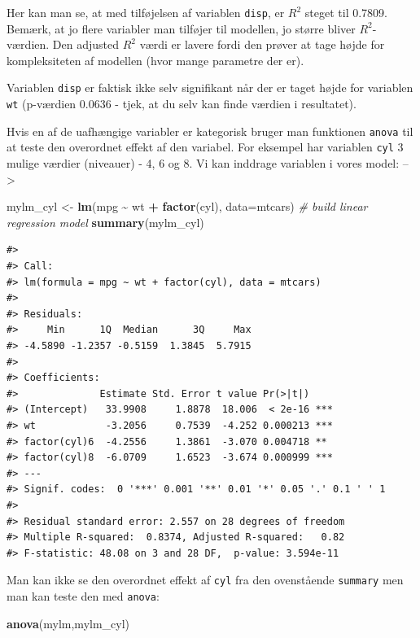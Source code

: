 \documentclass[
]{book}
\newenvironment{Shaded}{\begin{snugshade}}{\end{snugshade}}
\newcommand{\AttributeTok}[1]{\textcolor[rgb]{0.27,0.27,0.27}{#1}}
\newcommand{\CommentTok}[1]{\textcolor[rgb]{0.37,0.37,0.37}{\textit{#1}}}
\newcommand{\FunctionTok}[1]{\textcolor[rgb]{0.27,0.27,0.27}{\textbf{#1}}}
\newcommand{\NormalTok}[1]{#1}
\newcommand{\OtherTok}[1]{\textcolor[rgb]{0.37,0.37,0.37}{#1}}
\newcommand{\SpecialCharTok}[1]{\textcolor[rgb]{0.43,0.43,0.43}{\textbf{#1}}}
\begin{document}
Her kan man se, at med tilføjelsen af variablen \texttt{disp}, er \(R^2\) steget til 0.7809. Bemærk, at jo flere variabler man tilføjer til modellen, jo større bliver \(R^2\)-værdien. Den adjusted \(R^2\) værdi er lavere fordi den prøver at tage højde for kompleksiteten af modellen (hvor mange parametre der er).

Variablen \texttt{disp} er faktisk ikke selv signifikant når der er taget højde for variablen \texttt{wt} (p-værdien 0.0636 - tjek, at du selv kan finde værdien i resultatet).

Hvis en af de uafhængige variabler er kategorisk bruger man funktionen \texttt{anova} til at teste den overordnet effekt af den variabel. For eksempel har variablen \texttt{cyl} 3 mulige værdier (niveauer) - 4, 6 og 8. Vi kan inddrage variablen i vores model: --\textgreater{}

\begin{Shaded}
\begin{Highlighting}[]
\NormalTok{mylm\_cyl }\OtherTok{\textless{}{-}} \FunctionTok{lm}\NormalTok{(mpg }\SpecialCharTok{\textasciitilde{}}\NormalTok{ wt }\SpecialCharTok{+} \FunctionTok{factor}\NormalTok{(cyl), }\AttributeTok{data=}\NormalTok{mtcars) }\CommentTok{\# build linear regression model}
\FunctionTok{summary}\NormalTok{(mylm\_cyl)}
\end{Highlighting}
\end{Shaded}

\begin{verbatim}
#> 
#> Call:
#> lm(formula = mpg ~ wt + factor(cyl), data = mtcars)
#> 
#> Residuals:
#>     Min      1Q  Median      3Q     Max 
#> -4.5890 -1.2357 -0.5159  1.3845  5.7915 
#> 
#> Coefficients:
#>              Estimate Std. Error t value Pr(>|t|)    
#> (Intercept)   33.9908     1.8878  18.006  < 2e-16 ***
#> wt            -3.2056     0.7539  -4.252 0.000213 ***
#> factor(cyl)6  -4.2556     1.3861  -3.070 0.004718 ** 
#> factor(cyl)8  -6.0709     1.6523  -3.674 0.000999 ***
#> ---
#> Signif. codes:  0 '***' 0.001 '**' 0.01 '*' 0.05 '.' 0.1 ' ' 1
#> 
#> Residual standard error: 2.557 on 28 degrees of freedom
#> Multiple R-squared:  0.8374, Adjusted R-squared:   0.82 
#> F-statistic: 48.08 on 3 and 28 DF,  p-value: 3.594e-11
\end{verbatim}

Man kan ikke se den overordnet effekt af \texttt{cyl} fra den ovenstående \texttt{summary} men man kan teste den med \texttt{anova}:

\begin{Shaded}
\begin{Highlighting}[]
\FunctionTok{anova}\NormalTok{(mylm,mylm\_cyl)}
\end{Highlighting}
\end{Shaded}
\end{document}
